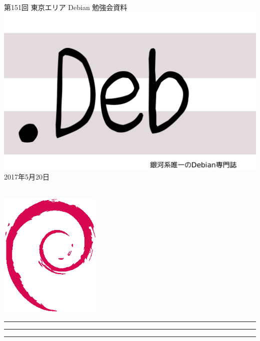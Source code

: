 \documentclass[mingoth,a4paper]{jsarticle}
\newcommand{\debmtgyear}{2017}
\newcommand{\debmtgmonth}{5}
\newcommand{\debmtgdate}{20}
\newcommand{\debmtgnumber}{151}
\begin{document}
\begin{titlepage}
\thispagestyle{empty}

\vspace*{-2cm}
第\debmtgnumber{}回 東京エリア Debian 勉強会資料\\
\hspace*{-2cm}
\includegraphics{image2012-natsu/dotdeb.pdf}\\
\hfill{}\debmtgyear{}年\debmtgmonth{}月\debmtgdate{}日

\\

\vspace*{-2cm}
\hfill{}\includegraphics[height=6cm]{image200502/openlogo-nd.eps}
\end{titlepage}

\newpage

\begin{minipage}[b]{0.2\hsize}
 \colorbox{titleback}{}
\end{minipage}
\begin{minipage}[b]{0.8\hsize}
\hrule
\vspace{2mm}
\hrule
\begin{multicols}{2}
\tableofcontents
\end{multicols}
\vspace{2mm}
\hrule
\end{minipage}
\end{document}
